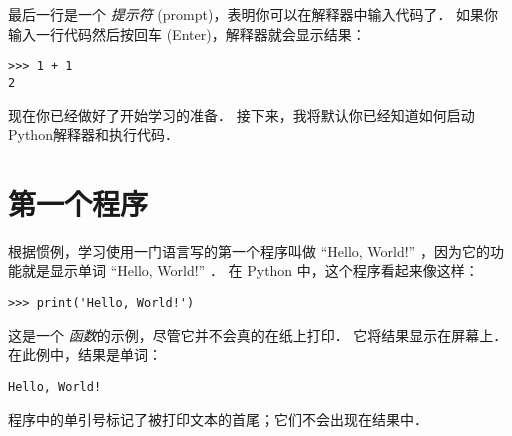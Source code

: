 最后一行是一个 {\em 提示符} (prompt)，表明你可以在解释器中输入代码了． 如果你输入一行代码然后按回车 (Enter)，解释器就会显示结果：

\begin{lstlisting}
>>> 1 + 1
2
\end{lstlisting}

%

现在你已经做好了开始学习的准备． 接下来，我将默认你已经知道如何启动Python解释器和执行代码．


\section{第一个程序}

\label{hello}


根据惯例，学习使用一门语言写的第一个程序叫做 ``Hello, World!'' ，因为它的功能就是显示单词 ``Hello, World!'' ．  在 Python 中，这个程序看起来像这样：

\begin{lstlisting}
>>> print('Hello, World!')
\end{lstlisting}

%

这是一个  {\em 函数}的示例，尽管它并不会真的在纸上打印．  它将结果显示在屏幕上．  在此例中，结果是单词：

\begin{lstlisting}
Hello, World!
\end{lstlisting}

%

程序中的单引号标记了被打印文本的首尾；它们不会出现在结果中．
    
    

